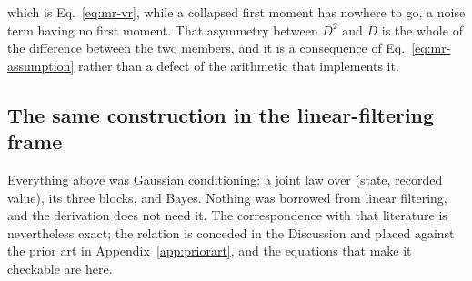 \begin{appendixbox}
which is Eq.~\ref{eq:mr-vr}, while a collapsed first moment has nowhere to go, a noise term having
no first moment. That asymmetry between $D^2$ and $D$ is the whole of the difference between the
two members, and it is a consequence of Eq.~\ref{eq:mr-assumption} rather than a defect of the
arithmetic that implements it.


\subsection*{The same construction in the linear-filtering frame}

Everything above was Gaussian conditioning: a joint law over (state, recorded value), its three
blocks, and Bayes. Nothing was borrowed from linear filtering, and the derivation does not need it.
The correspondence with that literature is nevertheless exact; the relation is conceded in the
Discussion and placed against the prior art in Appendix~\ref{app:priorart}, and the equations that
make it checkable are here.


\end{appendixbox}
